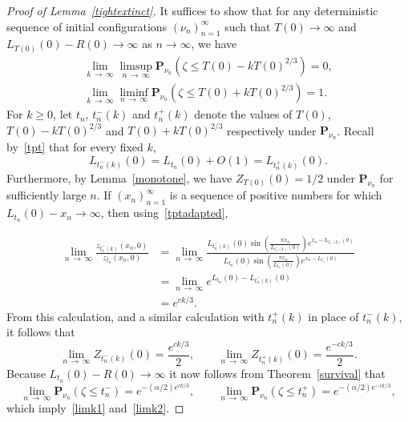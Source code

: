 \documentclass[AHL,Unicode,longabstracts,published]{cedram}
\renewcommand*\P{\mathbf{P}}
\newcommand{\1} {\mathds{1}}
\begin{document}
\begin{proof}[Proof of Lemma~\ref{tightextinct}]
It suffices to show that for any deterministic sequence of initial configurations $(\nu_n)_{n=1}^{\infty}$ such that $T(0) \rightarrow \infty$ and $L_{T(0)}(0) - R(0) \rightarrow \infty$ as $n \rightarrow \infty$, we have
\begin{align}
\lim_{k\, \rightarrow\,\infty} \limsup_{n\,\rightarrow\, \infty} \P_{\nu_n}(\zeta \leq T(0) - kT(0)^{2/3}) = 0, \label{limk1}
\\
\lim_{k\,\rightarrow\,\infty} \liminf_{n\,\rightarrow\, \infty} \P_{\nu_n}\left(\zeta \leq T(0) + k T(0)^{2/3}\right) = 1. \label{limk2}
\end{align}
For $k \geq 0$, let $t_n$, $t_n^-(k)$ and $t_n^+(k)$ denote the values of $T(0)$, $T(0) - kT(0)^{2/3}$ and $T(0) + kT(0)^{2/3}$ respectively under $\P_{\nu_n}$. Recall by~\eqref{tpt} that for every fixed $k$,
\begin{equation}\label{tptadapted}
L_{t_n^-(k)}(0) = L_{t_n}(0) + O(1) = L_{t_n^+(k)}(0).
\end{equation}
Furthermore, by Lemma~\ref{monotone}, we have $Z_{T(0)}(0) = 1/2$ under $\P_{\nu_n}$ for sufficiently large $n$. If $(x_n)_{n=1}^{\infty}$ is a sequence of positive numbers for which $L_{t_n}(0) - x_n \rightarrow \infty$, then using~\eqref{tptadapted},

\begin{align*}
\lim_{n\,\rightarrow\,\infty} \frac{z_{t_n^-(k)}(x_n, 0)}{z_{t_n}(x_n, 0)} &= \lim_{n\,\rightarrow\,\infty} \frac{L_{t_n^-(k)}(0) \sin\left(\frac{\pi x_n}{L_{t_n^-(k)}(0)}\right) e^{x_n - L_{t_n^-(k)}(0)}}{L_{t_n}(0) \sin\left(\frac{\pi x_n}{L_{t_n}(0)}\right) e^{x_n - L_{t_n}(0)}} \\
&= \lim_{n\,\rightarrow\,\infty} e^{L_{t_n}(0) - L_{t_n^-(k)}(0)} \\
&= e^{ck/3}.
\end{align*}
From this calculation, and a similar calculation with $t_n^+(k)$ in place of $t_n^-(k)$, it follows that
\begin{equation}\label{zchange}
\lim_{n\,\rightarrow\,\infty} Z_{t_n^-(k)}(0) = \frac{e^{ck/3}}{2}, \qquad\lim_{n\,\rightarrow\,\infty} Z_{t_n^+(k)}(0) = \frac{e^{-ck/3}}{2}.
\end{equation}
Because $L_{t_n}(0) - R(0) \rightarrow \infty$ it now follows from Theorem~\ref{survival} that
\[
\lim_{n\,\rightarrow\,\infty} \P_{\nu_n}\left(\zeta \leq t_n^-\right) = e^{-(\alpha/2) e^{ck/3}}, \qquad \lim_{n \,\rightarrow\,\infty} \P_{\nu_n}\left(\zeta \leq t_n^+\right) = e^{-(\alpha/2) e^{-ck/3}},
\]
which imply~\eqref{limk1} and~\eqref{limk2}.
\end{proof}
\end{document}
